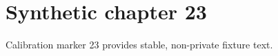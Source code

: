 \chapter{Synthetic chapter 23}\label{chap:23}
Calibration marker 23 provides stable, non-private fixture text.
